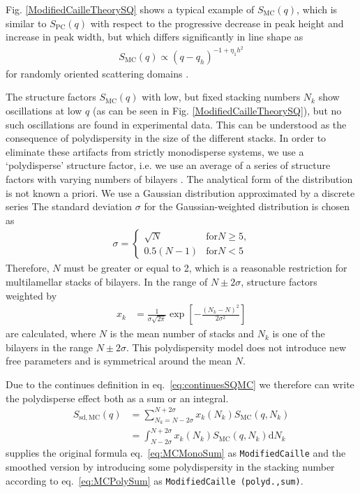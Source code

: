 Fig. \ref{ModifiedCailleTheorySQ} shows a typical example of
$S_{\mathrm{MC}}(q)$, which is similar to $S_\text{PC}(q)$ with
respect to the progressive decrease in peak height and increase in
peak width, but which differs significantly in line shape as
\begin{align}
S_{\mathrm{MC}}(q) \propto (q-q_h)^{-1+\eta_1 h^2}
\end{align}
for randomly oriented scattering domains \cite{Roux1988,Zhang1994}.


The structure factors $S_{\mathrm{MC}}(q)$ with low, but fixed
stacking numbers $N_k$ show oscillations at low $q$ (as can be seen in
Fig. \ref{ModifiedCailleTheorySQ}), but no such oscillations are
found in experimental data. This can be understood as the
consequence of polydispersity in the size of the different stacks.
In order to eliminate these artifacts from strictly monodisperse
systems, we use a `polydisperse' structure factor, i.e. we use an
average of a series of structure factors with varying numbers of
bilayers \cite{Fruhwirth2004}. The analytical form of the
distribution is not known a priori. We use a Gaussian distribution
approximated by a discrete series The standard deviation $\sigma$
for the Gaussian-weighted distribution is chosen as
\begin{align}
\sigma =
\begin{cases}
\sqrt{N} & \text{for} N\geq 5 \text{,} \\
0.5(N-1) & \text{for} N< 5
\end{cases}
\end{align}
Therefore, $N$ must be greater or equal to 2, which is a
reasonable restriction for multilamellar stacks of bilayers. In
the range of $N \pm 2\sigma$, structure factors weighted by
\begin{align}
x_k & = \frac{1}{\sigma\sqrt{2\pi}} \exp\left[
-\frac{(N_k-N)^2}{2\sigma^2}\right]
\end{align}
are calculated, where $N$ is the mean number of stacks and $N_k$
is one of the  bilayers in the range $N\pm 2\sigma$. This
polydispersity model does not introduce new free parameters and is
symmetrical around the mean $N$.

Due to the continues definition in eq.\ \ref{eq:continuesSQMC} we therefore can write the polydisperse effect both as a sum or an integral.
\begin{align}
  S_\mathrm{sd,MC}(q) & = \sum_{N_k=N-2\sigma}^{N+2\sigma} x_k(N_k) S_\mathrm{MC}(q,N_k) \label{eq:MCPolySum} \\
                      & = \int_{N-2\sigma}^{N+2\sigma} x_k(N_k) S_\mathrm{MC}(q,N_k) \mathrm{d}N_k
\end{align}
\SASfit supplies the original formula eq.\ \ref{eq:MCMonoSum} as  \texttt{ModifiedCaille} and the smoothed version by introducing some polydispersity in the stacking number according to eq.\ \ref{eq:MCPolySum} as \texttt{ModifiedCaille (polyd.,sum)}.

